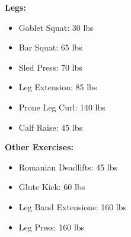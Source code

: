 \documentclass{article}
\begin{document}
\def\gs{30 }
\def\bs{65 }
\def\sp{70 }
\def\le{85 }
\def\plc{140 }
\def\cr{45 }

\def\rdl{45 }
\def\gk{60 }
\def\lbe{160 }
\def\lp{160 }

\textbf{Legs:}
\begin{itemize}
	\item Goblet Squat: \hfill\gs lbs
	\item Bar Squat: \hfill\bs lbs
	\item Sled Press: \hfill\sp lbs
	\item Leg Extension: \hfill\le lbs
	\item Prone Leg Curl: \hfill\plc lbs
	\item Calf Raise: \hfill\cr lbs
\end{itemize}\leavevmode\newline

\textbf{Other Exercises:}
\begin{itemize}
	\item Romanian Deadlifts: \hfill\rdl lbs
	\item Glute Kick: \hfill\gk lbs
	\item Leg Band Extensions: \hfill\lbe lbs
	\item Leg Press: \hfill\lp lbs
\end{itemize}
\end{document}
